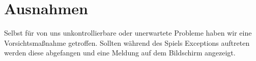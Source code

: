 %



\chapter{Ausnahmen}
\label{Kapitel:Ausnahmen}

Selbst für von uns unkontrollierbare oder unerwartete Probleme haben wir eine Vorsichtsmaßnahme getroffen. Sollten während des Spiels Exceptions auftreten werden diese abgefangen und eine Meldung auf dem Bildschirm angezeigt.\\










